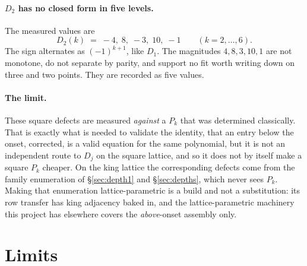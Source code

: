 \documentclass[11pt]{article}
\begin{document}
\paragraph{$D_2$ has no closed form in five levels.} The measured values are
\[
  D_2(k) \;=\; -4,\; 8,\; -3,\; 10,\; -1
  \qquad (k = 2,\dots,6).
\]
The sign alternates as $(-1)^{k+1}$, like $D_1$. The magnitudes $4, 8, 3, 10, 1$
are not monotone, do not separate by parity, and support no fit worth writing
down on three and two points. They are recorded as five values.

\paragraph{The limit.} These square defects are
measured \emph{against} a $P_k$ that was determined classically. That is
exactly what is needed to validate the identity, that an entry below the
onset, corrected, is a valid equation for the same polynomial, but it is not an
independent
route to $D_j$ on the square lattice, and so it does not by itself make a square
$P_k$ cheaper. On the king lattice the corresponding defects come from the
family enumeration of \S\ref{sec:depth1} and \S\ref{sec:depths}, which never
sees $P_k$. Making that enumeration lattice-parametric is a build and not a
substitution: its row transfer has king adjacency baked in, and the
lattice-parametric machinery this project has elsewhere covers the
\emph{above}-onset assembly only.


\section{Limits}
\label{sec:limits}
\end{document}
